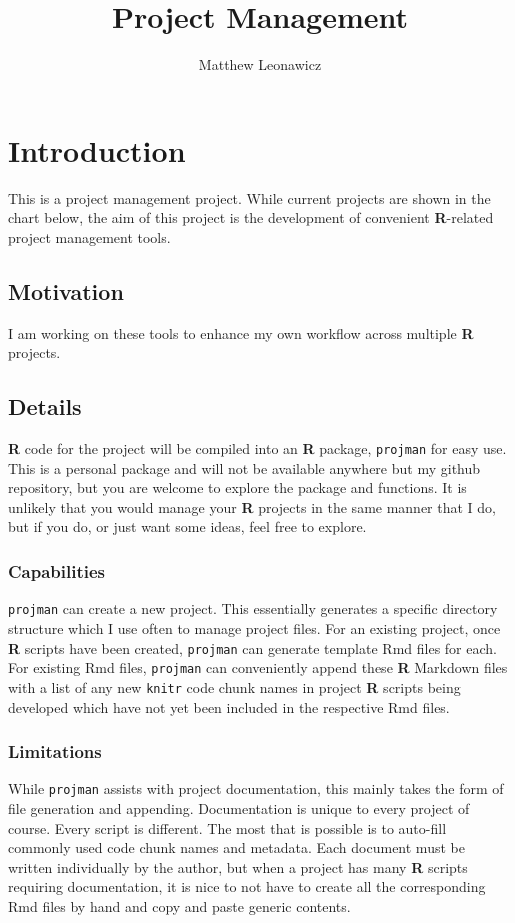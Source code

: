 \documentclass{article}\usepackage[]{graphicx}\usepackage[]{color}
\begin{document}
\title{Project Management}
\author{Matthew Leonawicz}
\maketitle






\section{Introduction}
This is a project management project.
While current projects are shown in the chart below, the aim of this project is the development of convenient \textbf{R}-related project management tools.

\subsection{Motivation}
I am working on these tools to enhance my own workflow across multiple \textbf{R} projects.

\subsection{Details}
\textbf{R} code for the project will be compiled into an \textbf{R} package, \texttt{projman} for easy use.
This is a personal package and will not be available anywhere but my github repository,
but you are welcome to explore the package and functions.
It is unlikely that you would manage your \textbf{R} projects in the same manner that I do,
but if you do, or just want some ideas, feel free to explore.

\subsubsection{Capabilities}
\texttt{projman} can create a new project. This essentially generates a specific directory structure which I use often to manage project files.
For an existing project, once \textbf{R} scripts have been created, \texttt{projman} can generate template Rmd files for each.
For existing Rmd files, \texttt{projman} can conveniently append these \textbf{R} Markdown files with a list of any new \texttt{knitr} code chunk names
in project \textbf{R} scripts being developed which have not yet been included in the respective Rmd files.

\subsubsection{Limitations}
While \texttt{projman} assists with project documentation, this mainly takes the form of file generation and appending.
Documentation is unique to every project of course. Every script is different.
The most that is possible is to auto-fill commonly used code chunk names and metadata.
Each document must be written individually by the author, but when a project has many \textbf{R} scripts requiring documentation,
it is nice to not have to create all the corresponding Rmd files by hand and copy and paste generic contents.
\end{document}
